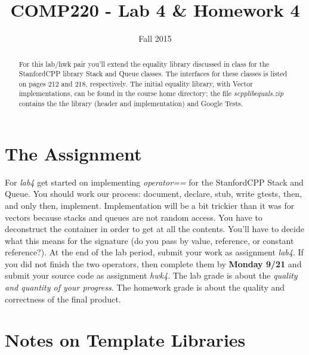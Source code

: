 \documentclass[10pt]{article}
\title{COMP220 - Lab 4 \& Homework 4}
\author{ }
\date{Fall 2015}
\begin{document}
\maketitle

\begin{abstract}
For this lab/hwk pair you'll extend the equality library discussed in class for the StanfordCPP library Stack and Queue classes.  The interfaces for these classes is listed on pages 212 and 218, respectively. The initial equality library, with Vector implementations, can be found in the course home directory; the file \textit{scpplibequals.zip} contains the the library (header and implementation) and Google Tests. 
\end{abstract}

\section{The Assignment}

For \textit{lab4} get started on implementing \textit{operator==} for the StanfordCPP Stack and Queue.   You should work our process: document, declare, stub, write gtests, then, and only then, implement. Implementation will be a bit trickier than it was for vectors because stacks and queues are not random access. You have to deconstruct the container in order to get at all the contents. You'll have to decide what this means for the signature (do you pass by value, reference, or constant reference?). At the end of the lab period, submit your work as assignment \textit{lab4}. If you did not finish the two operators, then complete them by \textbf{Monday 9/21} and submit your source code as assignment \textit{hwk4}. The lab grade is about the \textit{quality and quantity of your progress}. The homework grade is about the quality and correctness of the final product. 


\section{Notes on Template Libraries}
\end{document}
